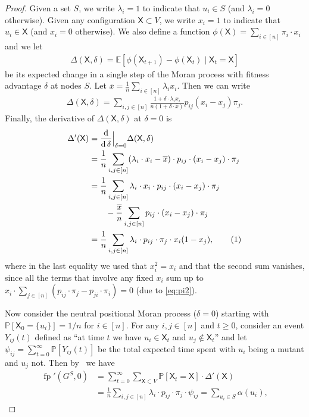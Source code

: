 \documentclass[letterpaper]{article}
\def\Pr{\mathbb{P}}
\def\d{\operatorname{d}}
\def\dfp{\fp'(G^S,0)}
\newcommand{\X}{\mathsf{X}}
\newcommand{\fp}{\operatorname{fp}}
\newcommand{\E}{\mathbb{E}}
\newcommand{\FitAdv}{\delta}
\newcommand\numberthis{\addtocounter{equation}{1}\tag{\theequation}}
\begin{document}
\thmweakselection*
\begin{proof}

Given a set $S$, we  write $\lambda_i=1$ to indicate that $u_i\in S$ (and $\lambda_i=0$ otherwise).
Given any configuration $\X\subset V$,
we write $x_i=1$ to indicate that $u_i\in\X$ (and $x_i=0$ otherwise).
We also define a function $\phi(\X)= \sum_{i\in[n]} \pi_i \cdot x_i$
and we let
\begin{align}
\Delta(\X,\FitAdv)=\E[\phi(\X_{t+1})-\phi(\X_t)\mid \X_t=\X]
\end{align}
be its expected change in a single step of the Moran process with fitness advantage $\FitAdv$ at nodes $S$.
Let $\overline{x}=\frac{1}{n}\sum_{i\in[n]}\lambda_ix_i$.
Then we can write
\begin{align}
\Delta(\X,\FitAdv) = \sum_{i,j\in[n]} \frac{1+\FitAdv \cdot \lambda_ix_i}{n(1+\FitAdv\cdot \overline{x})} p_{ij}(x_i-x_j)\pi_j.
\end{align}
Finally, the derivative of $\Delta(\X,\FitAdv)$ at $\FitAdv=0$ is
\begin{align*}
\Delta'(\X)  &=\frac{\d}{\d\FitAdv}\Bigr|_{\substack{\FitAdv=0}}  \Delta(\X,\FitAdv)\\
 &=\frac1n \sum_{i,j\in[n]} (\lambda_i \cdot  x_i - \overline{x}) \cdot     p_{ij}\cdot(x_i-x_j)\cdot \pi_j \\
 &=\frac1n \sum_{i,j\in[n]} \lambda_i \cdot x_i \cdot p_{ij}\cdot (x_i-x_j)\cdot \pi_j \\
&\qquad -\frac{\overline{x}}{n} \sum_{i,j\in[n]} p_{ij}\cdot(x_i-x_j)\cdot\pi_j\\
&=\frac1n\sum_{i,j\in[n]} \lambda_i \cdot p_{ij}\cdot \pi_j\cdot x_i(1-x_j),
\numberthis
\end{align*}
where in the last equality we used that $x_i^2=x_i$ and that the second sum vanishes, since all the terms that involve any fixed $x_i$ sum up to $x_i\cdot\sum_{j\in[n]} \left(p_{ij}\cdot\pi_j - p_{ji}\cdot\pi_i\right) =0$ (due to \cref{eq:pi2}).

Now consider the neutral positional Moran process ($\FitAdv=0$) starting with
$\Pr[\X_0=\{u_i\}]=1/n$ for $i\in[n]$.
For any $i,j\in[n]$ and $t\ge 0$, consider an
event $Y_{ij}(t)$ defined as ``at time $t$ we have $u_i\in \X_t$ and $u_j\not\in\X_t$''
and let $\psi_{ij}=\sum_{t=0}^\infty \Pr[Y_{ij}(t)]$ be the total expected time spent with $u_i$ being a mutant and $u_j$ not.
Then by~\cite[Theorem 1]{Mcavoy2021} we have
\begin{align*}
\dfp 
&= \sum_{t=0}^\infty  \sum_{\X\subset V} \Pr[\X_t=\X]\cdot \Delta'(\X) \\
 &= \frac{1}{n}\sum_{i,j\in[n]}\lambda_i \cdot p_{ij} \cdot \pi_j \cdot \psi_{ij}
    = \sum_{u_i\in S}  \alpha (u_i),
\end{align*}


\end{proof}
\end{document}
